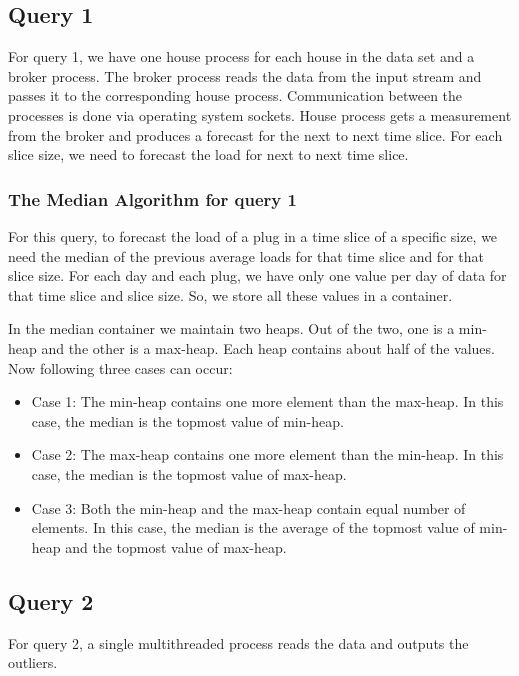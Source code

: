\subsection{Query 1}
For query 1, we have one house process for each house in the data set and a broker process. The broker process reads the data from the input stream and passes it to the corresponding house process. Communication between the processes is done via operating system sockets. House process gets a measurement from the broker and produces a forecast for the next to next time slice. 
For each slice size, we need to forecast the load for next to next time slice.
\subsubsection{The Median Algorithm for query 1}
For this query, to forecast the load of a plug in a time slice of a specific size, we need the median of the previous average loads for that time slice and for that slice size. For each day and each plug, we have only one value per day of data for that time slice and slice size. So, we store all these values in a container.

In the median container we maintain two heaps. Out of the two, one is a min-heap and the other is a max-heap. Each heap contains about half of the values. Now following three cases can occur:
\begin{itemize}
\item Case 1: The min-heap contains one more element than the max-heap. In this case, the median is the topmost value of min-heap.
\item Case 2: The max-heap contains one more element than the min-heap. In this case, the median is the topmost value of max-heap.
\item Case 3: Both the min-heap and the max-heap contain equal number of elements. In this case, the median is the average of the topmost value of min-heap and the topmost value of max-heap.

\end{itemize}
 
\subsection{Query 2}
For query 2, a single multithreaded process reads the data and outputs the outliers. 
